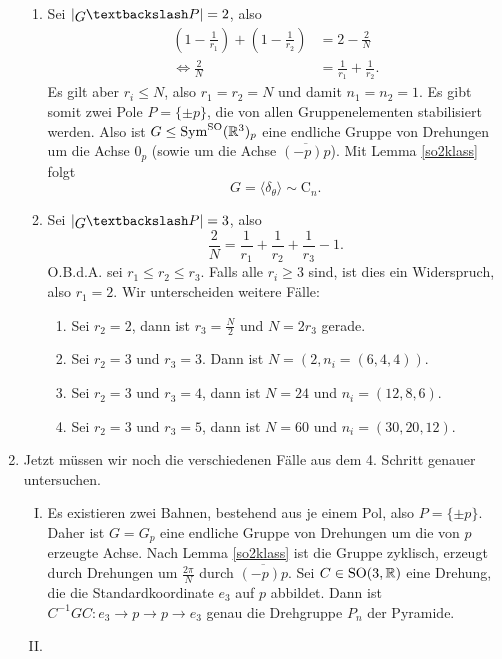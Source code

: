 \begin{beweis}
\begin{enumerate}
\begin{enumerate}[1. {Fall}:]
\item Sei $\left|\invquotient{G}{P}\right| =2$, also 
\begin{align}
\left( 1 - \frac{1}{r_1}\right) + \left(1 - \frac{1}{r_2} \right) &= 2 - \frac{2}{N}\\
\iff \frac{2}{N} &= \frac{1}{r_1}+ \frac{1}{r_2}.
\end{align}
Es gilt aber $r_i \leq N$, also $r_1=r_2=N$ und damit $n_1=n_2=1$. Es gibt somit zwei Pole $P=\{\pm p\}$, die von allen Gruppenelementen stabilisiert werden. Also ist $G \leq \text{Sym}^\text{SO} (\mathbb{R}^3)_p$ eine endliche Gruppe von Drehungen um die Achse $0_p$ (sowie um die Achse $\overline{(-p)p}$). Mit Lemma \ref{so2klass} folgt
\begin{equation}
G = \langle \delta_\theta \rangle \sim \text{C}_n.
\end{equation}
\item Sei $\left|\invquotient{G}{P}\right| =3$, also 
\begin{equation}
\frac{2}{N} = \frac{1}{r_1} + \frac{1}{r_2} + \frac{1}{r_3} - 1.
\end{equation}
O.B.d.A. sei $r_1 \leq r_2 \leq r_3$. Falls alle $r_i \geq 3$ sind, ist dies ein Widerspruch, also $r_1 = 2$. Wir unterscheiden weitere Fälle:
\begin{enumerate}[{3.}1. {Fall:}]
\item Sei $r_2=2$, dann ist $r_3 = \frac{N}{2}$ und $N=2r_3$ gerade.
\item Sei $r_2=3$ und $r_3 = 3$. Dann ist $N = (2, n_i = (6,4,4))$.
\item Sei $r_2 = 3$ und $r_3 = 4$, dann ist $N=24$ und $n_i = (12,8,6)$.
\item Sei $r_2=3$ und $r_3 =5$, dann ist $N=60$ und $n_i=(30,20,12)$.
\end{enumerate}
\end{enumerate}
\item Jetzt müssen wir noch die verschiedenen Fälle aus dem 4. Schritt genauer untersuchen.
\begin{enumerate}[(I)]
\item Es existieren zwei Bahnen, bestehend aus je einem Pol, also $P=\{\pm p\}$. Daher ist $G=G_p$ eine endliche Gruppe von Drehungen um die von $p$ erzeugte Achse. Nach Lemma \ref{so2klass} ist die Gruppe zyklisch, erzeugt durch Drehungen um $\frac{2\pi}{N}$ durch $\overline{(-p)p}$. Sei $C \in \text{SO}(3,\mathbb{R})$ eine Drehung, die die Standardkoordinate $e_3$ auf $p$ abbildet. Dann ist $C^{-1}GC: e_3 \to p \to p \to e_3$ genau die Drehgruppe $P_n$ der Pyramide.
\item 

\end{enumerate}
\end{enumerate}
\end{beweis}

